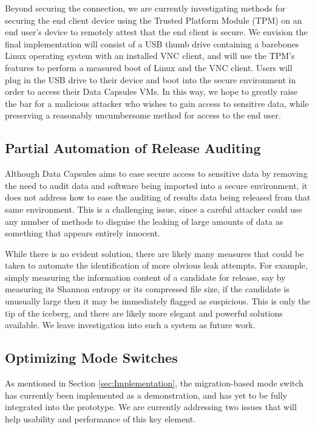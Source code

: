 \documentclass{acm_proc_article-sp}
\begin{document}
Beyond securing the connection, we are currently investigating methods for
securing the end client device using the Trusted Platform Module (TPM) on an end
user's device to remotely attest that the end client is secure.  We envision the
final implementation will consist of a USB thumb drive containing a barebones
Linux operating system with an installed VNC client, and will use the TPM's
features to perform a measured boot of Linux and the VNC client.  Users will
plug in the USB drive to their device and boot into the secure environment in
order to access their Data Capsules VMs.  In this way, we hope to greatly raise
the bar for a malicious attacker who wishes to gain access to sensitive data,
while preserving a reasonably uncumbersome method for access to the end user.

\subsection{Partial Automation of Release Auditing}
\label{sec:Results Audit}

Although Data Capsules aims to ease secure access to sensitive data by removing
the need to audit data and software being imported into a secure environment, it
does not address how to ease the auditing of results data being released from
that same environment.  This is a challenging issue, since a careful attacker
could use any number of methods to disguise the leaking of large amounts of data
as something that appears entirely innocent.

While there is no evident solution, there are likely many measures that could be
taken to automate the identification of more obvious leak attempts.  For
example, simply measuring the information content of a candidate for release,
say by measuring its Shannon entropy or its compressed file size, if the
candidate is unusually large then it may be immediately flagged as suspicious.
This is only the tip of the iceberg, and there are likely more elegant and
powerful solutions available.  We leave investigation into such a system as
future work.

\subsection{Optimizing Mode Switches}

As mentioned in Section \ref{sec:Implementation}, the migration-based mode
switch has currently been implemented as a demonstration, and has yet to be
fully integrated into the prototype.  We are currently addressing two
issues that will help usability and performance of this key element.
\end{document}
